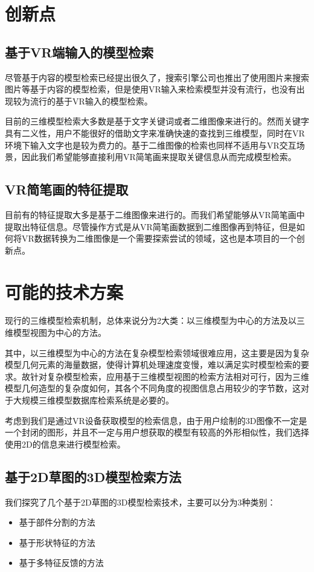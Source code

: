 \documentclass{article}
\begin{document}
\section{创新点}
\subsection{基于VR端输入的模型检索}
尽管基于内容的模型检索已经提出很久了，搜索引擎公司也推出了使用图片来搜索图片等基于内容的模型检索，但是使用VR输入来检索模型并没有流行，也没有出现较为流行的基于VR输入的模型检索。  

目前的三维模型检索大多数是基于文字关键词或者二维图像来进行的。然而关键字具有二义性，用户不能很好的借助文字来准确快速的查找到三维模型，同时在VR环境下输入文字也是较为费力的。基于二维图像的检索也同样不适用与VR交互场景，因此我们希望能够直接利用VR简笔画来提取关键信息从而完成模型检索。

\subsection{VR简笔画的特征提取}
目前有的特征提取大多是基于二维图像来进行的。而我们希望能够从VR简笔画中提取出特征信息。尽管操作方式是从VR简笔画数据到二维图像再到特征，但是如何将VR数据转换为二维图像是一个需要探索尝试的领域，这也是本项目的一个创新点。  


\section{可能的技术方案}

现行的三维模型检索机制，总体来说分为2大类：以三维模型为中心的方法及以三维模型视图为中心的方法。

其中，以三维模型为中心的方法在复杂模型检索领域很难应用，这主要是因为复杂模型几何元素的海量数据，使得计算机处理速度变慢，难以满足实时模型检索的要求。故针对复杂模型检索，应用基于三维模型视图的检索方法相对可行，因为三维模型几何造型的复杂度如何，其各个不同角度的视图信息占用较少的字节数，这对于大规模三维模型数据库检索系统是必要的。

考虑到我们是通过VR设备获取模型的检索信息，由于用户绘制的3D图像不一定是一个封闭的图形，并且不一定与用户想获取的模型有较高的外形相似性，我们选择使用2D的信息来进行模型检索。


\subsection{基于2D草图的3D模型检索方法}
我们探究了几个基于2D草图的3D模型检索技术，主要可以分为3种类别：
\begin{itemize}
    \item 基于部件分割的方法
    \item 基于形状特征的方法
    \item 基于多特征反馈的方法
\end{itemize}
\end{document}

